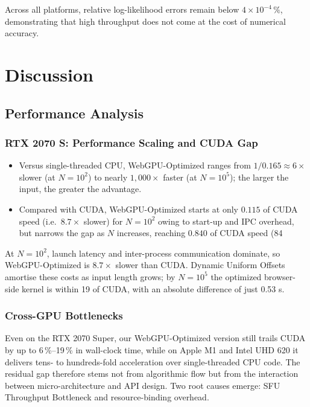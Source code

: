 \documentclass[PhD]{PHlab-thesis}
\begin{document}
Across all platforms, relative log-likelihood errors remain below $4\times10^{-4}\,\%$, demonstrating that high throughput does not come at the cost of numerical accuracy.





\chapter{Discussion}
\section{Performance Analysis}
\subsection{RTX 2070 S: Performance Scaling and CUDA Gap}  
\begin{itemize}
  \item Versus single-threaded CPU, WebGPU-Optimized ranges from
        $1/0.165 \approx 6\times$ slower (at $N=10^{2}$) to nearly
        $1{,}000\times$ faster (at $N=10^{5}$); the larger the input,
        the greater the advantage.
  \item Compared with CUDA, WebGPU-Optimized starts at only
        $0.115$ of CUDA speed (i.e.\ $8.7\times$ slower) for
        $N=10^{2}$ owing to start-up and IPC overhead, but
        narrows the gap as $N$ increases, reaching
        $0.840$ of CUDA speed (84 %
\end{itemize}

At $N=10^{2}$, launch latency and inter-process communication dominate,
so WebGPU-Optimized is $8.7\times$ slower than CUDA.  
Dynamic Uniform Offsets amortise these costs as input length grows;
by $N=10^{5}$ the optimized browser-side kernel is within 19 %
of CUDA, with an absolute difference of just 0.53 s.


\subsection{Cross-GPU Bottlenecks}
Even on the RTX 2070 Super, our WebGPU-Optimized version still trails CUDA by up to 6\,\%--19\,\% in wall-clock time, while on Apple M1 and Intel UHD 620 it delivers tens- to hundreds-fold acceleration over single-threaded CPU code. The residual gap therefore stems not from algorithmic flow but from the interaction between micro-architecture and API design. Two root causes emerge: SFU Throughput Bottleneck and resource-binding overhead.
\end{document}
